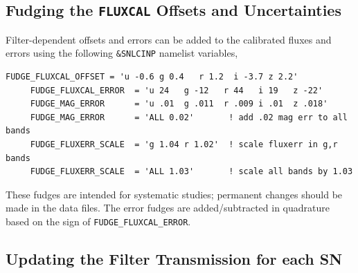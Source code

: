 \documentclass[12pt]{article}
\begin{document}
   \subsection{Fudging the {\tt FLUXCAL} Offsets and Uncertainties}
   \label{subsec:fudge_fluxcal}

Filter-dependent offsets and errors can be added to the 
calibrated fluxes and errors using the following {\tt \&SNLCINP} 
namelist variables,
%
\begin{Verbatim}[frame=single]
     FUDGE_FLUXCAL_OFFSET = 'u -0.6 g 0.4   r 1.2  i -3.7 z 2.2'
     FUDGE_FLUXCAL_ERROR  = 'u 24   g -12   r 44   i 19   z -22'
     FUDGE_MAG_ERROR      = 'u .01  g .011  r .009 i .01  z .018'
     FUDGE_MAG_ERROR      = 'ALL 0.02'       ! add .02 mag err to all bands
     FUDGE_FLUXERR_SCALE  = 'g 1.04 r 1.02'  ! scale fluxerr in g,r bands
     FUDGE_FLUXERR_SCALE  = 'ALL 1.03'       ! scale all bands by 1.03
\end{Verbatim}
These fudges are intended for  systematic studies;
permanent changes should be made in the data files.
The error fudges are added/subtracted in quadrature
based on the sign of {\tt FUDGE\_FLUXCAL\_ERROR}.

   \subsection{Updating the Filter Transmission for each SN}
   \label{subsec:filter_update}
\end{document}
